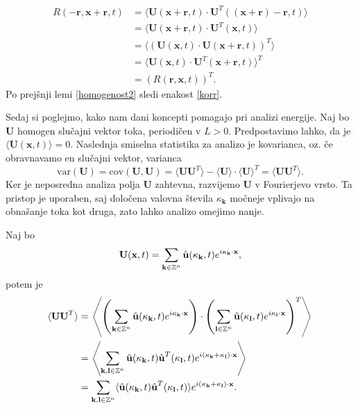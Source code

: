 \documentclass[mat2, tisk]{fmfdelo}
\newcommand{\Z}{\mathbb Z}
\newcommand{\bd}{\textbf}
\begin{document}
\begin{dokaz}
\begin{align*}
  R(-\bd{r}, \bd{x} + \bd{r}, t) &= \langle \bd{U}(\bd{x} + \bd{r}, t)\cdot \bd{U}^T((\bd{x} + \bd{r}) - \bd{r}, t)\rangle \\
  &= \langle \bd{U}(\bd{x} + \bd{r}, t)\cdot \bd{U}^T(\bd{x}, t)\rangle \\
  &= \langle(\bd{U}(\bd{x}, t)\cdot \bd{U}(\bd{x} + \bd{r}, t))^T\rangle \\
  &= \langle \bd{U}(\bd{x}, t)\cdot \bd{U}^T(\bd{x} + \bd{r}, t)\rangle^T \\
  &= (R(\bd{r}, \bd{x}, t))^T.
\end{align*}  
Po prejšnji lemi \ref{homogenost2} sledi enakost \ref{korr}.
\end{dokaz}

Sedaj si poglejmo, kako nam dani koncepti pomagajo pri analizi 
energije. Naj bo $\bd{U}$  homogen slučajni vektor toka, periodičen v $L>0$. 
Predpostavimo lahko, da je $\langle \bd{U}(\bd{x}, t) \rangle = 0$. Naslednja 
smiselna statistika za analizo je kovarianca, oz. če obravnavamo en 
slučajni vektor, varianca 
$$
\text{var}(\bd{U}) = \text{cov}(\bd{U}, \bd{U}) = \langle \bd{U} \bd{U}^T \rangle - \langle \bd{U} \rangle \cdot \langle \bd{U} \rangle^T = \langle \bd{U} \bd{U}^T \rangle.
$$
Ker je neposredna analiza polja \bd{U} zahtevna, razvijemo \bd{U}
v Fourierjevo vrsto. Ta pristop je uporaben, saj določena valovna 
števila $\bd{$\kappa$}_\bd{k}$ močneje vplivajo na obnašanje toka kot 
druga, zato lahko analizo omejimo nanje. 

Naj bo 
\begin{align*}
\bd{U}(\bd{x}, t) = \sum_{\bd{k}\in \Z^{n}} \hat{\bd{u}}(\bd{\text{$\kappa$}}_\bd{k}, t) e^{i\bd{\text{$\kappa$}}_\bd{k} \cdot \bd{x}},
\end{align*}
potem je
\begin{align*}
\langle \bd{U} \bd{U}^T\rangle &= \left\langle \left(\sum_{\bd{k}\in \Z^{n}} \hat{\bd{u}}(\bd{\text{$\kappa$}}_\bd{k}, t) e^{i\bd{\text{$\kappa$}}_\bd{k} \cdot \bd{x}}\right) \cdot \left(\sum_{\bd{l}\in \Z^{n}} \hat{\bd{u}}(\bd{\text{$\kappa$}}_\bd{l}, t) e^{i\bd{\text{$\kappa$}}_\bd{l} \cdot \bd{x}}\right)^T \right\rangle \\
&= \left\langle \sum_{\bd{k}, \bd{l}\in \Z^{n}} \hat{\bd{u}}(\bd{\text{$\kappa$}}_\bd{k}, t) \hat{\bd{u}}^T(\bd{\text{$\kappa$}}_\bd{l}, t) e^{i(\bd{\text{$\kappa$}}_\bd{k} + \bd{\text{$\kappa$}}_\bd{l})\cdot \bd{x}} \right\rangle \\
&=  \sum_{\bd{k}, \bd{l}\in \Z^{n}} \langle \hat{\bd{u}}(\bd{\text{$\kappa$}}_\bd{k}, t) \hat{\bd{u}}^T(\bd{\text{$\kappa$}}_\bd{l}, t) \rangle e^{i(\bd{\text{$\kappa$}}_\bd{k} + \bd{\text{$\kappa$}}_\bd{l})\cdot \bd{x}}.
\end{align*}
\end{document}
